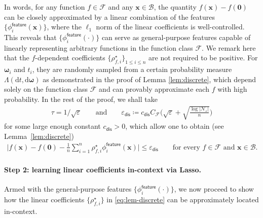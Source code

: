 \documentclass[english]{article}
\begin{document}
In words, for any function $f\in \mathcal{F}$ and any $\bm{x}\in \mathcal{B}$, the quantity $f(\bm{x})-f(\bm{0})$ can be closely approximated by a linear combination of the features $\{\phi_i^{\mathsf{feature}}(\bm{x})\}$, where the $\ell_1$ norm of the linear coefficients is well-controlled. This reveals that $\{\phi_i^{\mathsf{feature}}(\cdot)\}$ can serve as general-purpose features capable of linearly representing arbitrary functions in the function class $\mathcal{F}$.
We remark here that the $f$-dependent coefficients $\{\rho_{f,i}^{\star}\}_{1\le i\le n}$ are not required to be positive.
For ${\bm \omega}_i$ and $t_i$, they are randomly sampled from a certain probability measure $\Lambda(\mathrm{d}t,\mathrm{d} {\bm \omega})$ as demonstrated in the proof of Lemma \ref{lem:discrete}, which depend solely on the function class $\mathcal{F}$ and can provably approximate each $f$ with high probability. 
In the rest of the proof, we shall take 
%
\begin{align}\label{eq:eps-dis}
\tau = 1/\sqrt{\varepsilon}
\qquad \text{and} \qquad
\varepsilon_{\mathsf{dis}} \coloneqq c_{\mathsf{dis}}C_{\mathcal{F}}\bigg(\sqrt{\varepsilon} + \sqrt{\frac{\log|\mathcal{N}_{\varepsilon}|}{n}}\bigg)
\end{align}
%
for some large enough constant $c_{\mathsf{dis}}>0$, which allow one to obtain (see Lemma~\ref{lem:discrete})
%
\begin{align}
\label{eq:f-approx-epsilon-dis}
\bigg|f({\bm x}) - f(\bm{0}) - \frac{1}{n}\sum_{i = 1}^n\rho^{\star}_{f, i}\phi^{\mathsf{feature}}_i(\bm{x})\bigg|
\le \varepsilon_{\mathsf{dis}}
\qquad 
\text{for every } f\in\mathcal{F} \text{ and  } \bm{x}\in \mathcal{B}. 
\end{align}


\paragraph{Step 2: learning linear coefficients in-context via Lasso.}
%
Armed with the general-purpose features $\{\phi_i^{\mathsf{feature}}(\cdot)\}$, we now proceed to show how the linear coefficients $\{\rho^{\star}_{f,i}\}$ in \eqref{eq:lem-discrete} can be approximately located in-context. 
\end{document}
